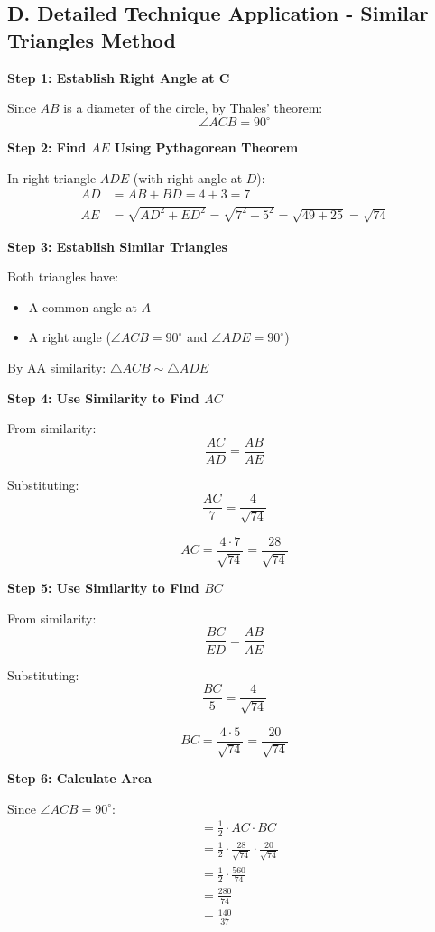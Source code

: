 \documentclass[]{article}
\begin{document}
\begin{techniquesbox}
\subsection*{D. Detailed Technique Application - Similar Triangles Method}

\textbf{Step 1: Establish Right Angle at C}

Since $AB$ is a diameter of the circle, by Thales' theorem:
\[\angle ACB = 90^\circ\]

\textbf{Step 2: Find $AE$ Using Pythagorean Theorem}

In right triangle $ADE$ (with right angle at $D$):
\begin{align*}
AD &= AB + BD = 4 + 3 = 7\\
AE &= \sqrt{AD^2 + ED^2} = \sqrt{7^2 + 5^2} = \sqrt{49 + 25} = \sqrt{74}
\end{align*}

\textbf{Step 3: Establish Similar Triangles}

Both triangles have:
\begin{itemize}
    \item A common angle at $A$
    \item A right angle ($\angle ACB = 90^\circ$ and $\angle ADE = 90^\circ$)
\end{itemize}

By AA similarity: $\triangle ACB \sim \triangle ADE$

\textbf{Step 4: Use Similarity to Find $AC$}

From similarity:
\[\frac{AC}{AD} = \frac{AB}{AE}\]

Substituting:
\[\frac{AC}{7} = \frac{4}{\sqrt{74}}\]

\[AC = \frac{4 \cdot 7}{\sqrt{74}} = \frac{28}{\sqrt{74}}\]

\textbf{Step 5: Use Similarity to Find $BC$}

From similarity:
\[\frac{BC}{ED} = \frac{AB}{AE}\]

Substituting:
\[\frac{BC}{5} = \frac{4}{\sqrt{74}}\]

\[BC = \frac{4 \cdot 5}{\sqrt{74}} = \frac{20}{\sqrt{74}}\]

\textbf{Step 6: Calculate Area}

Since $\angle ACB = 90^\circ$:
\begin{align*}
[\triangle ABC] &= \frac{1}{2} \cdot AC \cdot BC\\
&= \frac{1}{2} \cdot \frac{28}{\sqrt{74}} \cdot \frac{20}{\sqrt{74}}\\
&= \frac{1}{2} \cdot \frac{560}{74}\\
&= \frac{280}{74}\\
&= \frac{140}{37}
\end{align*}


\end{techniquesbox}
\end{document}
